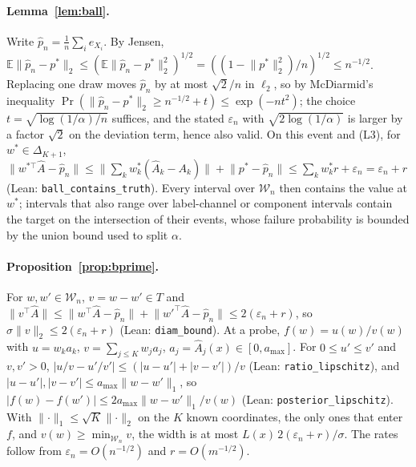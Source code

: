 \documentclass[twoside]{article}
\begin{document}
\paragraph{Lemma~\ref{lem:ball}.} Write $\hat p_n=\frac1n\sum_{i}e_{X_i}$. By Jensen,
$\mathbb E\lVert\hat p_n-p^{*}\rVert_2\le(\mathbb E\lVert\hat p_n-p^{*}\rVert_2^2)^{1/2}
=((1-\lVert p^{*}\rVert_2^2)/n)^{1/2}\le n^{-1/2}$. Replacing one draw moves $\hat p_n$ by at most
$\sqrt2/n$ in $\ell_2$, so by McDiarmid's inequality
$\Pr(\lVert\hat p_n-p^{*}\rVert_2\ge n^{-1/2}+t)\le\exp(-nt^2)$; the choice
$t=\sqrt{\log(1/\alpha)/n}$ suffices, and the stated $\varepsilon_n$ with $\sqrt{2\log(1/\alpha)}$
is larger by a factor $\sqrt2$ on the deviation term, hence also valid.
On this event and (L3), for $w^{*}\in\Delta_{K+1}$,
$\lVert w^{*\top}\hat A-\hat p_n\rVert\le\lVert\sum_kw^{*}_k(\hat A_k-A_k)\rVert+\lVert p^{*}-\hat p_n\rVert
\le\sum_kw^{*}_k r+\varepsilon_n=\varepsilon_n+r$ (Lean: \texttt{ball\_contains\_truth}). Every
interval over $\mathcal W_n$ then contains the value at $w^{*}$; intervals that also range over
label-channel or component intervals contain the target on the intersection of their events, whose
failure probability is bounded by the union bound used to split $\alpha$.

\paragraph{Proposition~\ref{prop:bprime}.} For $w,w'\in\mathcal W_n$, $v=w-w'\in T$ and
$\lVert v^{\top}\hat A\rVert\le\lVert w^{\top}\hat A-\hat p_n\rVert+\lVert w'^{\top}\hat A-\hat p_n\rVert
\le2(\varepsilon_n+r)$, so $\sigma\lVert v\rVert_2\le2(\varepsilon_n+r)$ (Lean: \texttt{diam\_bound}).
At a probe, $f(w)=u(w)/v(w)$ with $u=w_ka_k$, $v=\sum_{j\le K}w_ja_j$, $a_j=\hat A_j(x)\in[0,a_{\max}]$.
For $0\le u'\le v'$ and $v,v'>0$, $|u/v-u'/v'|\le(|u-u'|+|v-v'|)/v$ (Lean: \texttt{ratio\_lipschitz}),
and $|u-u'|,|v-v'|\le a_{\max}\lVert w-w'\rVert_1$, so
$|f(w)-f(w')|\le2a_{\max}\lVert w-w'\rVert_1/v(w)$ (Lean: \texttt{posterior\_lipschitz}). With
$\lVert\cdot\rVert_1\le\sqrt{K}\lVert\cdot\rVert_2$ on the $K$ known coordinates, the only ones that
enter $f$, and $v(w)\ge\min_{\mathcal W_n}v$, the width is at most
$L(x)\,2(\varepsilon_n+r)/\sigma$. The rates follow from $\varepsilon_n=O(n^{-1/2})$ and
$r=O(m^{-1/2})$.
\end{document}
